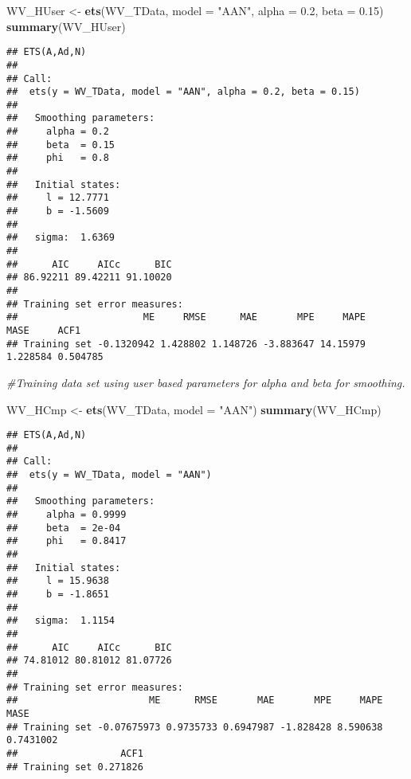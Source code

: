 \documentclass[
]{article}
\newenvironment{Shaded}{\begin{snugshade}}{\end{snugshade}}
\newcommand{\CommentTok}[1]{\textcolor[rgb]{0.56,0.35,0.01}{\textit{#1}}}
\newcommand{\DataTypeTok}[1]{\textcolor[rgb]{0.13,0.29,0.53}{#1}}
\newcommand{\FloatTok}[1]{\textcolor[rgb]{0.00,0.00,0.81}{#1}}
\newcommand{\KeywordTok}[1]{\textcolor[rgb]{0.13,0.29,0.53}{\textbf{#1}}}
\newcommand{\NormalTok}[1]{#1}
\newcommand{\StringTok}[1]{\textcolor[rgb]{0.31,0.60,0.02}{#1}}
\begin{document}
\begin{Shaded}
\begin{Highlighting}[]
\NormalTok{WV_HUser <-}\StringTok{ }\KeywordTok{ets}\NormalTok{(WV_TData, }\DataTypeTok{model =} \StringTok{"AAN"}\NormalTok{, }\DataTypeTok{alpha =} \FloatTok{0.2}\NormalTok{, }\DataTypeTok{beta =} \FloatTok{0.15}\NormalTok{)}
\KeywordTok{summary}\NormalTok{(WV_HUser)}
\end{Highlighting}
\end{Shaded}

\begin{verbatim}
## ETS(A,Ad,N) 
## 
## Call:
##  ets(y = WV_TData, model = "AAN", alpha = 0.2, beta = 0.15) 
## 
##   Smoothing parameters:
##     alpha = 0.2 
##     beta  = 0.15 
##     phi   = 0.8 
## 
##   Initial states:
##     l = 12.7771 
##     b = -1.5609 
## 
##   sigma:  1.6369
## 
##      AIC     AICc      BIC 
## 86.92211 89.42211 91.10020 
## 
## Training set error measures:
##                      ME     RMSE      MAE       MPE     MAPE     MASE     ACF1
## Training set -0.1320942 1.428802 1.148726 -3.883647 14.15979 1.228584 0.504785
\end{verbatim}

\begin{Shaded}
\begin{Highlighting}[]
\CommentTok{#Training data set using user based parameters for alpha and beta for smoothing.}
\end{Highlighting}
\end{Shaded}

\begin{Shaded}
\begin{Highlighting}[]
\NormalTok{WV_HCmp <-}\StringTok{ }\KeywordTok{ets}\NormalTok{(WV_TData, }\DataTypeTok{model =} \StringTok{"AAN"}\NormalTok{)}
\KeywordTok{summary}\NormalTok{(WV_HCmp)}
\end{Highlighting}
\end{Shaded}

\begin{verbatim}
## ETS(A,Ad,N) 
## 
## Call:
##  ets(y = WV_TData, model = "AAN") 
## 
##   Smoothing parameters:
##     alpha = 0.9999 
##     beta  = 2e-04 
##     phi   = 0.8417 
## 
##   Initial states:
##     l = 15.9638 
##     b = -1.8651 
## 
##   sigma:  1.1154
## 
##      AIC     AICc      BIC 
## 74.81012 80.81012 81.07726 
## 
## Training set error measures:
##                       ME      RMSE       MAE       MPE     MAPE      MASE
## Training set -0.07675973 0.9735733 0.6947987 -1.828428 8.590638 0.7431002
##                  ACF1
## Training set 0.271826
\end{verbatim}
\end{document}
